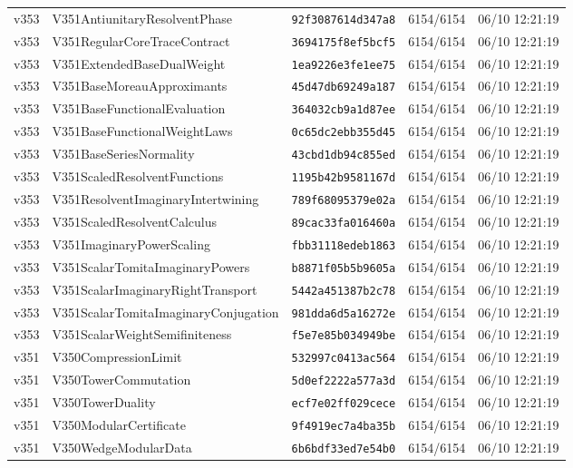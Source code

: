 \documentclass[11pt]{article}
\theoremstyle{definition}\newtheorem{deriv}{Derivation}
\begin{document}
{\begin{longtable}{@{}lllll@{}}
v353 & V351AntiunitaryResolventPhase & \texttt{92f3087614d347a8} & 6154/6154 & 06/10 12:21:19 \\
v353 & V351RegularCoreTraceContract & \texttt{3694175f8ef5bcf5} & 6154/6154 & 06/10 12:21:19 \\
v353 & V351ExtendedBaseDualWeight & \texttt{1ea9226e3fe1ee75} & 6154/6154 & 06/10 12:21:19 \\
v353 & V351BaseMoreauApproximants & \texttt{45d47db69249a187} & 6154/6154 & 06/10 12:21:19 \\
v353 & V351BaseFunctionalEvaluation & \texttt{364032cb9a1d87ee} & 6154/6154 & 06/10 12:21:19 \\
v353 & V351BaseFunctionalWeightLaws & \texttt{0c65dc2ebb355d45} & 6154/6154 & 06/10 12:21:19 \\
v353 & V351BaseSeriesNormality & \texttt{43cbd1db94c855ed} & 6154/6154 & 06/10 12:21:19 \\
v353 & V351ScaledResolventFunctions & \texttt{1195b42b9581167d} & 6154/6154 & 06/10 12:21:19 \\
v353 & V351ResolventImaginaryIntertwining & \texttt{789f68095379e02a} & 6154/6154 & 06/10 12:21:19 \\
v353 & V351ScaledResolventCalculus & \texttt{89cac33fa016460a} & 6154/6154 & 06/10 12:21:19 \\
v353 & V351ImaginaryPowerScaling & \texttt{fbb31118edeb1863} & 6154/6154 & 06/10 12:21:19 \\
v353 & V351ScalarTomitaImaginaryPowers & \texttt{b8871f05b5b9605a} & 6154/6154 & 06/10 12:21:19 \\
v353 & V351ScalarImaginaryRightTransport & \texttt{5442a451387b2c78} & 6154/6154 & 06/10 12:21:19 \\
v353 & V351ScalarTomitaImaginaryConjugation & \texttt{981dda6d5a16272e} & 6154/6154 & 06/10 12:21:19 \\
v353 & V351ScalarWeightSemifiniteness & \texttt{f5e7e85b034949be} & 6154/6154 & 06/10 12:21:19 \\
v351 & V350CompressionLimit & \texttt{532997c0413ac564} & 6154/6154 & 06/10 12:21:19 \\
v351 & V350TowerCommutation & \texttt{5d0ef2222a577a3d} & 6154/6154 & 06/10 12:21:19 \\
v351 & V350TowerDuality & \texttt{ecf7e02ff029cece} & 6154/6154 & 06/10 12:21:19 \\
v351 & V350ModularCertificate & \texttt{9f4919ec7a4ba35b} & 6154/6154 & 06/10 12:21:19 \\
v351 & V350WedgeModularData & \texttt{6b6bdf33ed7e54b0} & 6154/6154 & 06/10 12:21:19 \\

\end{longtable}}
\end{document}
